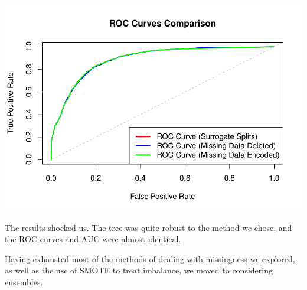\documentclass[
]{article}
\begin{document}
\includegraphics{04-02.3-MissingnessMethodsWithSmote_files/figure-latex/unnamed-chunk-4-1.pdf}

The results shocked us. The tree was quite robust to the method we chose, and the ROC curves and AUC were almost identical.

Having exhausted most of the methods of dealing with missingness we explored, as well as the use of SMOTE to treat imbalance, we moved to considering ensembles.
\end{document}
